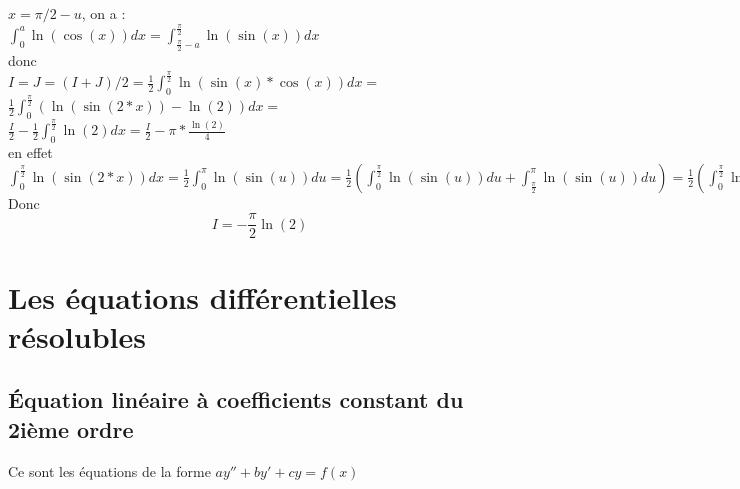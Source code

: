 \documentclass[a4paper,11pt]{book}
\begin{document}
$x=\pi/2-u$, on a :\\
$\displaystyle \int_0^a\ln(\cos(x))dx=\int_{\frac{\pi}{2}-a}^{\frac{\pi}{2}}\ln(\sin(x))dx$\\
donc \\
$\displaystyle I=J=(I+J)/2=\frac{1}{2}\int_0^{\frac{\pi}{2}}\ln(\sin(x)*\cos(x))dx=$\\
$\displaystyle \frac{1}{2}\int_0^{\frac{\pi}{2}}(\ln(\sin(2*x))-\ln(2))dx=$\\
$\displaystyle \frac{I}{2}-\frac{1}{2}\int_0^{\frac{\pi}{2}}\ln(2)dx=\frac{I}{2}-\pi*\frac{\ln(2)}{4}$\\
en effet \\
$\displaystyle \int_0^{\frac{\pi}{2}}\ln(\sin(2*x))dx=\frac{1}{2}\int_0^\pi\ln(\sin(u))du=
\frac{1}{2}(\int_0^{\frac{\pi}{2}}\ln(\sin(u))du+\int_{\frac{\pi}{2}}^\pi\ln(\sin(u))du)=
\frac{1}{2}(\int_0^{\frac{\pi}{2}}\ln(\sin(u))du-\int_{\frac{\pi}{2}}^0\ln(\sin(\pi-t))dt)=\frac{1}{2}(I+I)=I$\\
Donc $$I=-\frac{\pi}{2}\ln(2)$$


\chapter{Les \'equations diff\'erentielles r\'esolubles}
\section{\'Equation lin\'eaire \`a coefficients constant du 2i\`eme ordre}
Ce sont les \'equations de la forme $ay''+by'+cy=f(x)$
\end{document}
